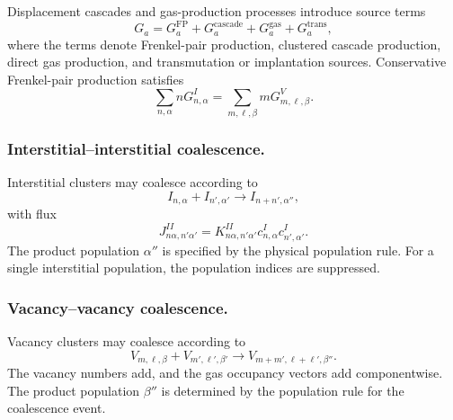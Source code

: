 Displacement cascades and gas-production processes introduce source terms
\begin{equation}
    G_a
    =
    G_a^{\mathrm{FP}}
    +
    G_a^{\mathrm{cascade}}
    +
    G_a^{\mathrm{gas}}
    +
    G_a^{\mathrm{trans}},
    \label{eq:general_source_decomposition}
\end{equation}
where the terms denote Frenkel-pair production, clustered cascade production,
direct gas production, and transmutation or implantation sources. Conservative
Frenkel-pair production satisfies
\begin{equation}
    \sum_{n,\alpha} n G^I_{n,\alpha}
    =
    \sum_{m,\boldsymbol{\ell},\beta} m G^V_{m,\boldsymbol{\ell},\beta} .
    \label{eq:cascade_pair_conservation}
\end{equation}

\subsubsection*{Interstitial--interstitial coalescence.}

Interstitial clusters may coalesce according to
\begin{equation}
    I_{n,\alpha}+I_{n',\alpha'}
    \longrightarrow
    I_{n+n',\alpha''},
    \label{eq:II_coalescence}
\end{equation}
with flux
\begin{equation}
    J^{II}_{n\alpha,n'\alpha'}
    =
    K^{II}_{n\alpha,n'\alpha'}
    c^I_{n,\alpha}c^I_{n',\alpha'} .
\end{equation}
The product population $\alpha''$ is specified by the physical population rule.
For a single interstitial population, the population indices are suppressed.

\subsubsection*{Vacancy--vacancy coalescence.}

Vacancy clusters may coalesce according to
\begin{equation}
    V_{m,\boldsymbol{\ell},\beta}
    +
    V_{m',\boldsymbol{\ell}',\beta'}
    \longrightarrow
    V_{m+m',\boldsymbol{\ell}+\boldsymbol{\ell}',\beta''} .
    \label{eq:VV_coalescence}
\end{equation}
The vacancy numbers add, and the gas occupancy vectors add componentwise. The
product population $\beta''$ is determined by the population rule for the
coalescence event.

